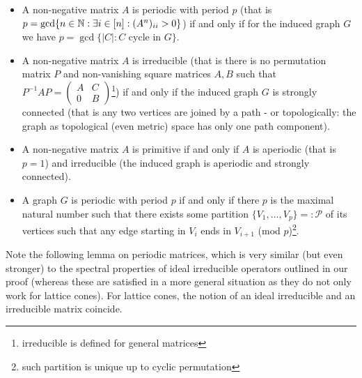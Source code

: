 \documentclass{article}
\begin{document}
\begin{itemize}
\item A non-negative matrix $A$ is periodic with period $p$ (that is $p=\gcd\{n\in\mathbb{N}:\exists i\in[n]:(A^n)_{ii}>0\}$) if and only if for the induced graph $G$ we have $p=\gcd\{|C|:C \text{ cycle in } G\}$.
\item A non-negative matrix $A$ is irreducible (that is there is no permutation matrix $P$ and non-vanishing square matrices $A,B$ such that $P^{-1}AP=\begin{pmatrix} A & C \\ 0 & B\end{pmatrix}$\footnote{irreducible is defined for general matrices}) if and only if the induced graph $G$ is strongly connected (that is any two vertices are joined by a path - or topologically: the graph as topological (even metric) space has only one path component).
\item A non-negative matrix $A$ is primitive if and only if $A$ is aperiodic (that is $p=1$) and irreducible (the induced graph is aperiodic and strongly connected).
\item A graph $G$ is periodic with period $p$ if and only if there $p$ is the maximal natural number such that there exists some partition $\{V_1,\ldots,V_p\}=:\mathcal{P}$ of its vertices such  that any edge starting in $V_i$ ends in $V_{i+1}$ (mod $p$)\footnote{such partition is unique up to cyclic permutation}.
\end{itemize}

Note the following lemma on periodic matrices, which is very similar (but even stronger) to the spectral properties of ideal irreducible operators outlined in our proof (whereas these are satisfied in a more general situation as they do not only work for lattice cones). For lattice cones, the notion of an ideal irreducible and an irreducible matrix coincide. 
\end{document}

